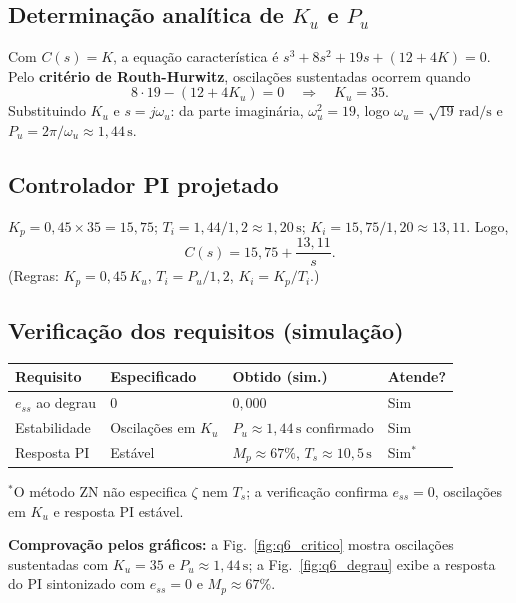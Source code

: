 \documentclass[11pt,a4paper]{article}
\begin{document}
\subsection*{Determinação analítica de $K_u$ e $P_u$}

Com $C(s)=K$, a equação característica é
$s^3+8s^2+19s+(12+4K)=0$. Pelo \textbf{critério de Routh-Hurwitz}, oscilações
sustentadas ocorrem quando
\[
  8\cdot 19-(12+4K_u)=0 \quad\Rightarrow\quad K_u=35.
\]
Substituindo $K_u$ e $s=j\omega_u$: da parte imaginária,
$\omega_u^2=19$, logo $\omega_u=\sqrt{19}\,\mathrm{rad/s}$ e
$P_u=2\pi/\omega_u\approx 1{,}44\,\mathrm{s}$.

\subsection*{Controlador PI projetado}

$K_p=0{,}45\times 35=15{,}75$;
$T_i=1{,}44/1{,}2\approx 1{,}20\,\mathrm{s}$;
$K_i=15{,}75/1{,}20\approx 13{,}11$. Logo,
\[
  C(s)=15{,}75+\frac{13{,}11}{s}.
\]
(Regras: $K_p=0{,}45\,K_u$, $T_i=P_u/1{,}2$, $K_i=K_p/T_i$.)

\subsection*{Verificação dos requisitos (simulação)}

\begin{center}
\small
\begin{tabular}{@{}llll@{}}
  \toprule
  Requisito & Especificado & Obtido (sim.) & Atende? \\
  \midrule
  $e_{ss}$ ao degrau & $0$ & $0{,}000$ & Sim \\
  Estabilidade & Oscilações em $K_u$ & $P_u\approx 1{,}44\,\mathrm{s}$ confirmado & Sim \\
  Resposta PI & Estável & $M_p\approx 67\%$, $T_s\approx 10{,}5\,\mathrm{s}$ & Sim$^*$ \\
  \bottomrule
\end{tabular}
\end{center}

{\small $^*$O método ZN não especifica $\zeta$ nem $T_s$; a verificação
confirma $e_{ss}=0$, oscilações em $K_u$ e resposta PI estável.}

\textbf{Comprovação pelos gráficos:} a Fig.~\ref{fig:q6_critico} mostra
oscilações sustentadas com $K_u=35$ e $P_u\approx 1{,}44\,\mathrm{s}$; a
Fig.~\ref{fig:q6_degrau} exibe a resposta do PI sintonizado com $e_{ss}=0$ e
$M_p\approx 67\%$.
\end{document}
